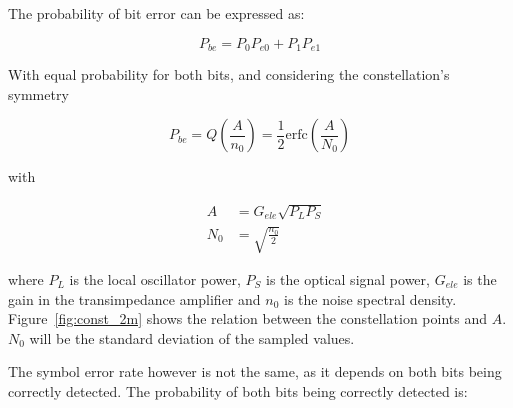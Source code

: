The probability of bit error can be expressed as:

\begin{equation}
P_{be} = P_0 P_{e0} + P_1 P_{e1}
\end{equation}

With equal probability for both bits, and considering the constellation's symmetry

\begin{equation}\label{eq:berMQAM}
P_{be} =  Q\left({\frac{A}{n_0}}\right) = \frac{1}{2} \text{erfc}\left({\frac{A}{N_0}}\right)
\end{equation}





with


\begin{eqnarray}
&A &= G_{ele} \sqrt{P_L P_S} \\
&N_0 &= \sqrt{\frac{n_0}{2}}
\end{eqnarray}

\noindent where $P_L$ is the local oscillator power, $P_S$ is the optical signal power, $G_{ele}$ is the gain in the transimpedance amplifier and $n_0$ is the noise spectral density. Figure~\ref{fig:const_2m} shows the relation between the constellation points and $A$. $N_0$ will be the standard deviation of the sampled values.





The symbol error rate however is not the same, as it depends on both bits being correctly detected. The probability of both bits being correctly detected is:

